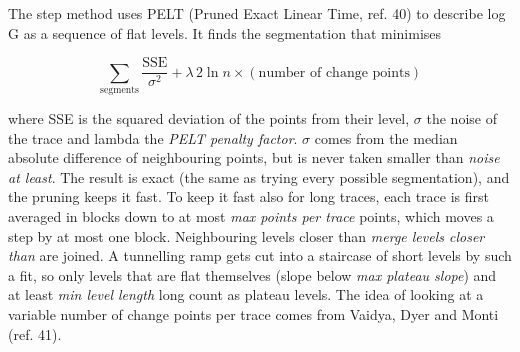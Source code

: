 \documentclass[
  11pt,
  a4paper,
]{article}
\begin{document}
The step method uses PELT (Pruned Exact Linear Time, ref. 40) to
describe log G as a sequence of flat levels. It finds the segmentation
that minimises

\[
\sum_\text{segments} \frac{\mathrm{SSE}}{\sigma^2} + \lambda\, 2 \ln n \times (\text{number of change points})
\]

where SSE is the squared deviation of the points from their level,
$\sigma$ the noise of the trace and lambda the \emph{PELT penalty
factor}. $\sigma$ comes from the median absolute difference of
neighbouring points, but is never taken smaller than \emph{noise at
least}. The result is exact (the same as trying every possible
segmentation), and the pruning keeps it fast. To keep it fast also for
long traces, each trace is first averaged in blocks down to at most
\emph{max points per trace} points, which moves a step by at most one
block. Neighbouring levels closer than \emph{merge levels closer than}
are joined. A tunnelling ramp gets cut into a staircase of short levels
by such a fit, so only levels that are flat themselves (slope below
\emph{max plateau slope}) and at least \emph{min level length} long
count as plateau levels. The idea of looking at a variable number of
change points per trace comes from Vaidya, Dyer and Monti (ref. 41).
\end{document}
